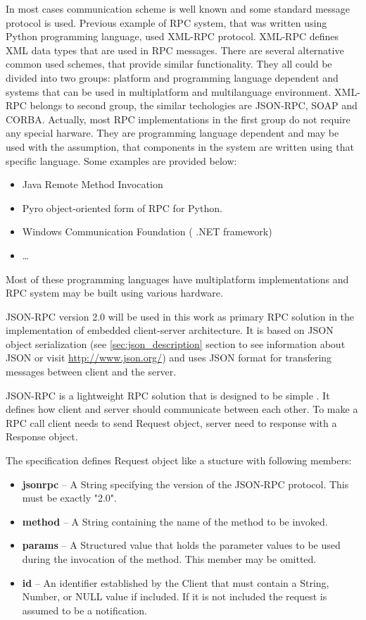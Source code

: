 In most cases communication scheme is well known and some standard
message protocol is used. Previous example of RPC system, that was written using
Python programming language, used XML-RPC protocol. XML-RPC defines XML data
types that are used in RPC messages. There are several alternative common used
schemes, that provide similar functionality. They all could be divided into
two groups: platform and programming language dependent and systems that  
can be used in multiplatform and multilanguage environment. XML-RPC belongs to
second group, the similar techologies are JSON-RPC, SOAP and CORBA.
Actually, most RPC implementations in the first group do not require any special
harware. They are programming language dependent and may be used with
the assumption, that components in the system are written using that specific
language. Some examples are provided below:
\begin{itemize}
  \item Java Remote Method Invocation
  \item Pyro object-oriented form of RPC for Python.
  \item Windows Communication Foundation ( .NET framework)
  \item \ldots   
\end{itemize} 
Most of these programming languages have multiplatform implementations and RPC
system may be built using various hardware.

JSON-RPC version 2.0 will be used in this work as primary RPC solution in the implementation of embedded client-server architecture. 
It is based on \gls{JSON} object serialization (see \ref{sec:json_description} section to see information about JSON or visit \url{http://www.json.org/})
and uses JSON format for  transfering messages between client and the server.

JSON-RPC is a lightweight RPC solution that is designed to be simple \cite{jsonrpc_spec}.
It defines how client and server should communicate between each other. 
To make a RPC call client needs to send Request object, server need to response with a Response object.

The specification \cite{jsonrpc_spec} defines Request object like a stucture with following members:
\begin{itemize}
\item \textbf{jsonrpc} -- A String specifying the version of the JSON-RPC protocol. This must be exactly "2.0".
\item \textbf{method} -- A String containing the name of the method to be invoked.
\item \textbf{params} -- A Structured value that holds the parameter values to be used during the invocation of the method. This member may be omitted.
\item \textbf{id} --  An identifier established by the Client that must contain a String, Number, or NULL value if included. If it is not included the request is assumed to be a notification. 
\end{itemize}


